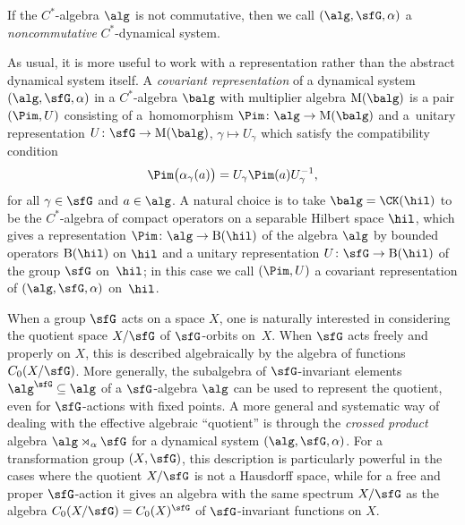 If the $C^*$-algebra $\alg$ is not commutative, then we call
$(\alg,\sfG,\alpha)$ a \emph{noncommutative} $C^*$-dynamical system.

As usual, it is more useful to work with a representation rather than the
abstract dynamical system itself. A \emph{covariant representation} of
a dynamical system $(\alg,\sfG,\alpha)$ in a $C^*$-algebra $\balg$ with
multiplier algebra ${\rm M}(\balg)$ is a
pair $(\Pim,U)$ consisting of a~homomorphism $\Pim\colon \alg\to {\rm M}(\balg)$ and a~unitary representation $U\colon \sfG\to{\rm M}(\balg)$, $\gamma\mapsto U_\gamma$ which satisfy the compatibility condition
\[
\Pim\big(\alpha_\gamma(a)\big) = U_\gamma \Pim(a) U_\gamma^{-1} ,
\]
for all $\gamma\in \sfG$ and $a\in\alg$. A natural choice is to take
$\balg=\CK(\hil)$ to be the $C^*$-algebra of compact operators on a
separable Hilbert space $\hil$, which gives a
representation $\Pim\colon \alg\to{\rm B}(\hil)$ of the algebra $\alg$ by
bounded operators ${\rm B}(\hil)$ on $\hil$ and a unitary representation
$U\colon \sfG\to{\rm B}(\hil)$ of the group $\sfG$ on~$\hil$; in this case
we call $(\Pim,U)$ a covariant representation of $(\alg,\sfG,\alpha)$ on~$\hil$.

When a group $\sfG$ acts on a space $X$, one is naturally interested
in considering the
quotient space $X/\sfG$ of $\sfG$-orbits on~$X$. When $\sfG$ acts
freely and properly on
$X$, this is described algebraically by the algebra of functions
$C_0(X/\sfG)$. More generally, the subalgebra of $\sfG$-invariant elements
$\alg^\sfG\subseteq\alg$ of a $\sfG$-algebra $\alg$ can be used to represent the quotient, even for
$\sfG$-actions with fixed points. A more general and systematic way of
dealing with the effective algebraic ``quotient'' is through the
\emph{crossed product} algebra $\alg\rtimes_\alpha \sfG$ for a dynamical
system $(\alg,\sfG,\alpha)$. For a transformation group $(X,\sfG)$,
this description is particularly powerful in the cases where the
quotient $X/\sfG$ is not a Hausdorff space, while for a free and proper
$\sfG$-action it gives an algebra with the same spectrum $X/\sfG$
as the algebra $C_0(X/\sfG)=C_0(X)^\sfG$ of
$\sfG$-invariant functions on $X$.

